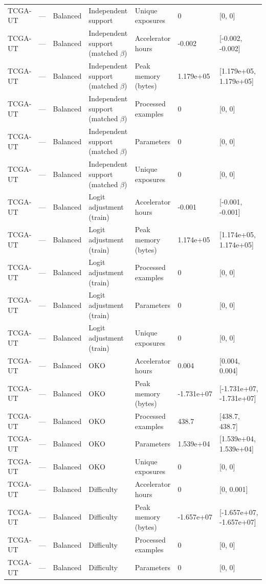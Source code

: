 \begin{longtable}{lllllll}
TCGA-UT & --- & Balanced & Independent support & Unique exposures & 0 & [0, 0] \\
TCGA-UT & --- & Balanced & Independent support (matched $\beta$) & Accelerator hours & -0.002 & [-0.002, -0.002] \\
TCGA-UT & --- & Balanced & Independent support (matched $\beta$) & Peak memory (bytes) & 1.179e+05 & [1.179e+05, 1.179e+05] \\
TCGA-UT & --- & Balanced & Independent support (matched $\beta$) & Processed examples & 0 & [0, 0] \\
TCGA-UT & --- & Balanced & Independent support (matched $\beta$) & Parameters & 0 & [0, 0] \\
TCGA-UT & --- & Balanced & Independent support (matched $\beta$) & Unique exposures & 0 & [0, 0] \\
TCGA-UT & --- & Balanced & Logit adjustment (train) & Accelerator hours & -0.001 & [-0.001, -0.001] \\
TCGA-UT & --- & Balanced & Logit adjustment (train) & Peak memory (bytes) & 1.174e+05 & [1.174e+05, 1.174e+05] \\
TCGA-UT & --- & Balanced & Logit adjustment (train) & Processed examples & 0 & [0, 0] \\
TCGA-UT & --- & Balanced & Logit adjustment (train) & Parameters & 0 & [0, 0] \\
TCGA-UT & --- & Balanced & Logit adjustment (train) & Unique exposures & 0 & [0, 0] \\
TCGA-UT & --- & Balanced & OKO & Accelerator hours & 0.004 & [0.004, 0.004] \\
TCGA-UT & --- & Balanced & OKO & Peak memory (bytes) & -1.731e+07 & [-1.731e+07, -1.731e+07] \\
TCGA-UT & --- & Balanced & OKO & Processed examples & 438.7 & [438.7, 438.7] \\
TCGA-UT & --- & Balanced & OKO & Parameters & 1.539e+04 & [1.539e+04, 1.539e+04] \\
TCGA-UT & --- & Balanced & OKO & Unique exposures & 0 & [0, 0] \\
TCGA-UT & --- & Balanced & Difficulty & Accelerator hours & 0 & [0, 0.001] \\
TCGA-UT & --- & Balanced & Difficulty & Peak memory (bytes) & -1.657e+07 & [-1.657e+07, -1.657e+07] \\
TCGA-UT & --- & Balanced & Difficulty & Processed examples & 0 & [0, 0] \\
TCGA-UT & --- & Balanced & Difficulty & Parameters & 0 & [0, 0] \\

\end{longtable}
